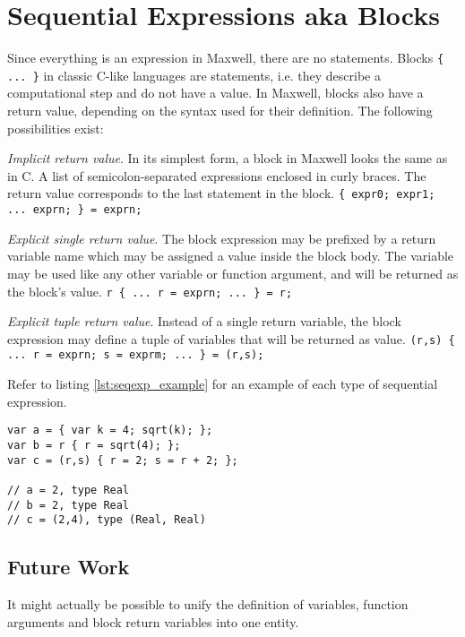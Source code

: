 \section{Sequential Expressions aka Blocks}

Since everything is an expression in Maxwell, there are no statements. Blocks \lstinline|{ ... }| in classic C-like languages are statements, i.e. they describe a computational step and do not have a value. In Maxwell, blocks also have a return value, depending on the syntax used for their definition. The following possibilities exist:

\emph{Implicit return value}. In its simplest form, a block in Maxwell looks the same as in C. A list of semicolon-separated expressions enclosed in curly braces. The return value corresponds to the last statement in the block.
\lstinline|{ expr0; expr1; ... exprn; } = exprn;|

\emph{Explicit single return value}. The block expression may be prefixed by a return variable name which may be assigned a value inside the block body. The variable may be used like any other variable or function argument, and will be returned as the block's value.
\lstinline|r { ... r = exprn; ... } = r;|

\emph{Explicit tuple return value}. Instead of a single return variable, the block expression may define a tuple of variables that will be returned as value.
\lstinline|(r,s) { ... r = exprn; s = exprm; ... } = (r,s);|

Refer to listing \ref{lst:seqexp_example} for an example of each type of sequential expression.
\begin{lstlisting}[float,caption=Sequential Expression examples,label=lst:seqexp_example]
var a = { var k = 4; sqrt(k); };
var b = r { r = sqrt(4); };
var c = (r,s) { r = 2; s = r + 2; };

// a = 2, type Real
// b = 2, type Real
// c = (2,4), type (Real, Real)
\end{lstlisting}


\subsection{Future Work}
It might actually be possible to unify the definition of variables, function arguments and block return variables into one entity.
